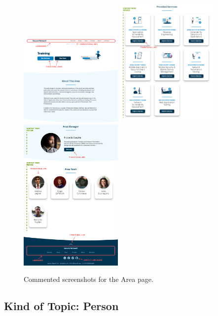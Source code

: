 \documentclass[12pt]{report}
\begin{document}
\begin{figure}[H]
	\centering
	\includegraphics[width=0.45\textwidth]{high_fid_wireframes/area/1.png}
	\includegraphics[width=0.45\textwidth]{high_fid_wireframes/area/2.png}
	\includegraphics[width=0.45\textwidth]{high_fid_wireframes/area/3.png}
	\caption{Commented screenshots for the Area page.}
\end{figure}

\subsection{Kind of Topic: Person}
\end{document}
